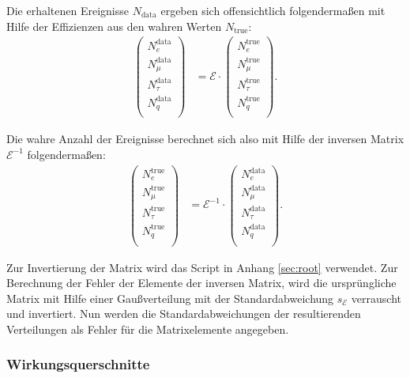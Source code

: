Die erhaltenen Ereignisse $N_\text{data}$ ergeben sich offensichtlich folgendermaßen mit Hilfe der Effizienzen aus den wahren Werten $N_\text{true}$:
\begin{align}
	\begin{pmatrix}
		N_e^\text{data}\\
		N_\mu^\text{data}\\
		N_\tau^\text{data}\\
		N_q^\text{data}\\
	\end{pmatrix}
	&=
	\mathcal{E}\cdot
	\begin{pmatrix}
	N_e^\text{true}\\
	N_\mu^\text{true}\\
	N_\tau^\text{true}\\
	N_q^\text{true}\\
	\end{pmatrix}\text{.}
\end{align}

Die wahre Anzahl der Ereignisse berechnet sich also mit Hilfe der inversen Matrix $\mathcal{E}^{-1}$ folgendermaßen:
\begin{align}
\begin{pmatrix}
N_e^\text{true}\\
N_\mu^\text{true}\\
N_\tau^\text{true}\\
N_q^\text{true}\\
\end{pmatrix}
&=
\mathcal{E}^{-1}\cdot
\begin{pmatrix}
N_e^\text{data}\\
N_\mu^\text{data}\\
N_\tau^\text{data}\\
N_q^\text{data}\\
\end{pmatrix}\text{.}
\end{align}

Zur Invertierung der Matrix wird das Script  in Anhang \ref{sec:root} verwendet. Zur Berechnung der Fehler der Elemente der inversen Matrix, wird die ursprüngliche Matrix mit Hilfe einer Gaußverteilung mit der Standardabweichung $s_\mathcal{E}$ verrauscht und invertiert. Nun werden die Standardabweichungen der resultierenden Verteilungen als Fehler für die Matrixelemente angegeben.

\subsubsection{Wirkungsquerschnitte}

